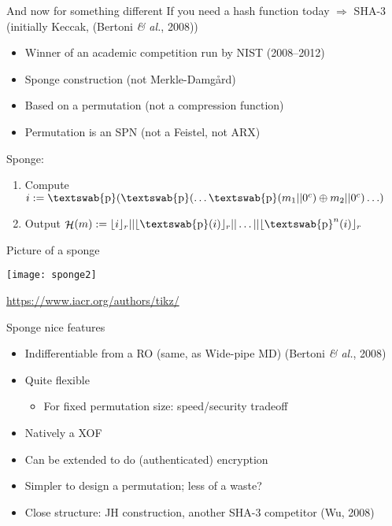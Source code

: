 \documentclass[xcolor=table,usenames,dvipsnames,compress]{beamer}
\newcommand\etal{\emph{\& al.}\xspace}
\newcommand\defas{:=}
\DeclareMathOperator\hash{\mathcal{H}}
\DeclareMathOperator\perm{\textswab{p}}
\begin{document}
\begin{frame}{And now for something different}
If you need a hash function today $\Rightarrow$ SHA-3 (initially Keccak, (Bertoni \etal, 2008))
\begin{itemize}
\item Winner of an academic competition run by NIST (2008--2012)
\end{itemize}
\begin{itemize}
\item Sponge construction (not Merkle-Damg\aa rd)
\item Based on a permutation (not a compression function)
\item Permutation is an SPN (not a Feistel, not ARX)
\end{itemize}

Sponge:
\begin{enumerate}
\item Compute $i \defas \perm(\perm(\ldots\perm(m_1||0^c)\oplus m_2||0^c)\ldots)$
\item Output $\hash(m) \defas \lfloor i \rfloor_r || \lfloor \perm(i) \rfloor_r || \ldots || \lfloor \perm^n(i) \rfloor_r$
\end{enumerate}

\end{frame}

\begin{frame}{Picture of a sponge}
\begin{center}
\texttt{[image: sponge2]}
\end{center}
\url{https://www.iacr.org/authors/tikz/}
\end{frame}

\begin{frame}{Sponge nice features}
\begin{itemize}
\item Indifferentiable from a RO (same, as Wide-pipe MD) (Bertoni \etal, 2008)
\item Quite flexible
\begin{itemize}
\item For fixed permutation size: speed/security tradeoff
\end{itemize}
\item Natively a XOF
\item Can be extended to do (authenticated) encryption
\item Simpler to design a permutation; less of a waste?
\end{itemize}

\begin{itemize}
\item Close structure: JH construction, another SHA-3 competitor (Wu, 2008)
\end{itemize}

\end{frame}
\end{document}
